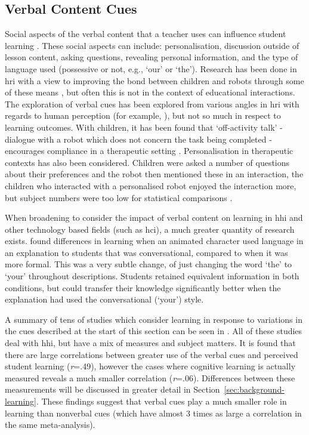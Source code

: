 \subsection{Verbal Content Cues} \label{sec:background-verbal}
Social aspects of the verbal content that a teacher uses can influence student learning \citep{gorham1988relationship,witt2004meta}. These social aspects can include: personalisation, discussion outside of lesson content, asking questions, revealing personal information, and the type of language used (possessive or not, e.g., `our' or `the'). Research has been done in \acrshort{hri} with a view to improving the bond between children and robots through some of these means \citep{belpaeme2012multimodal}, but often this is not in the context of educational interactions. The exploration of verbal cues has been explored from various angles in \acrshort{hri} with regards to human perception (for example, \citealp{andrist2013rhetorical}), but not so much in respect to learning outcomes. With children, it has been found that `off-activity talk' - dialogue with a robot which does not concern the task being completed - encourages compliance in a therapeutic setting \citep{kruijff2014oat}. Personalisation in therapeutic contexts has also been considered. Children were asked a number of questions about their preferences and the robot then mentioned these in an interaction, the children who interacted with a personalised robot enjoyed the interaction more, but subject numbers were too low for statistical comparisons \citep{henkemans2013using}.

When broadening to consider the impact of verbal content on learning in \acrshort{hhi} and other technology based fields (such as \acrshort{hci}), a much greater quantity of research exists. \cite{mayer2004personalization} found differences in learning when an animated character used language in an explanation to students that was conversational, compared to when it was more formal. This was a very subtle change, of just changing the word `the' to `your' throughout descriptions. Students retained equivalent information in both conditions, but could transfer their knowledge significantly better when the explanation had used the conversational (`your') style.

A summary of tens of studies which consider learning in response to variations in the cues described at the start of this section can be seen in \cite{witt2004meta}. All of these studies deal with \acrshort{hhi}, but have a mix of measures and subject matters. It is found that there are large correlations between greater use of the verbal cues and perceived student learning (\textit{r}=.49), however the cases where cognitive learning is actually measured reveals a much smaller correlation (\textit{r}=.06). Differences between these measurements will be discussed in greater detail in Section~\ref{sec:background-learning}. These findings suggest that verbal cues play a much smaller role in learning than nonverbal cues (which have almost 3 times as large a correlation in the same meta-analysis).

